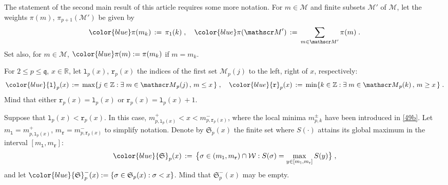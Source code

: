 \documentclass[reqno]{amsart}
\theoremstyle{plain}
\theoremstyle{definition}
\newcommand{\mc}[1]{{\mathcal #1}}
\newcommand{\mf}[1]{{\mathfrak #1}}
\newcommand{\bb}[1]{{\mathbb #1}}
\newcommand{\ms}[1]{{\mathscr #1}}
\newcommand{\mtt}[1]{{\mathtt #1}}
\newcounter{as}[section]
\newcommand{\<}{\langle}
\renewcommand{\>}{\rangle}
\begin{document}
The statement of the second main result of this article requires some
more notation. For $m\in\mathcal{M}$ and finite subsets $\ms M'$ of
$\mc M$, let the weights $\pi(m)$, $\pi_{p+1}(\ms M')$ be given by
\begin{equation}
\label{104}
{\color{blue}\pi(m_k)} \,:=\, \pi_1(k)\;, \quad
{\color{blue}\pi (\ms M')} \, :=\,
\sum_{m\in \ms M'}\pi(m)\;.
\end{equation}
Set also, for $m\in\mc M$, ${\color{blue}\pi(m)} := \pi(m_k)$ if $m=m_k$.

For $2\le p\le \mf q$, $x\in \bb R$, let $\mtt l_p(x)$, $\mtt r_p(x)$
the indices of the first set $\ms M_p(j)$ to the left, right of $x$,
respectively:
\begin{equation}
\label{85}
{\color{blue} \mtt l_p(x)} \,:=\, 
\max\{ j\in \bb Z : \exists\; m\in \ms M_p(j) \,,\,
m \le  x\,\}\;, \quad
{\color{blue}  \mtt r_p(x)} 
\,:=\, \min\{ k\in \bb Z : \exists\; m\in \ms M_p(k) \,,\,
m \ge x\,\}\;.
\end{equation}
Mind that either $\mtt r_p(x) = \mtt l_p(x)$ or
$\mtt r_p(x) = \mtt l_p(x) +1$.  

Suppose that $\mtt l_p(x) < \mtt r_p(x)$. In this case,
$m^+_{p,\mtt l_p(x)} < x < m^-_{p,\mtt r_p(x)}$, where the local
minima $m^\pm_{p,k}$ have been introduced in \eqref{49b}.  Let
$m_{\mtt l} = m^+_{p,\mtt l_p(x)}$, $m_{\mtt r} = m^-_{p,\mtt r_p(x)}$
to simplify notation.
Denote by $\mf S_p(x)$ the finite set where $S(\cdot)$ attains its global
maximum in the interval $[m_{\mtt l} , m_{\mtt r}]$:
\begin{equation*}
{\color{blue} \mf S_p(x)}  \,:=\, \big\{\sigma \in (m_{\mtt l} , m_{\mtt r})
\cap \mc W : S(\sigma) = \max_{y\in
[m_{\mtt l} , m_{\mtt r}]} S(y) \big\}\;,
\end{equation*}
and let
${\color{blue} \mf S^-_p(x)} : = \{\sigma\in \mf S_p(x) : \sigma <
x\}$. Mind that $\mf S^-_p(x)$ may be empty.
\end{document}
